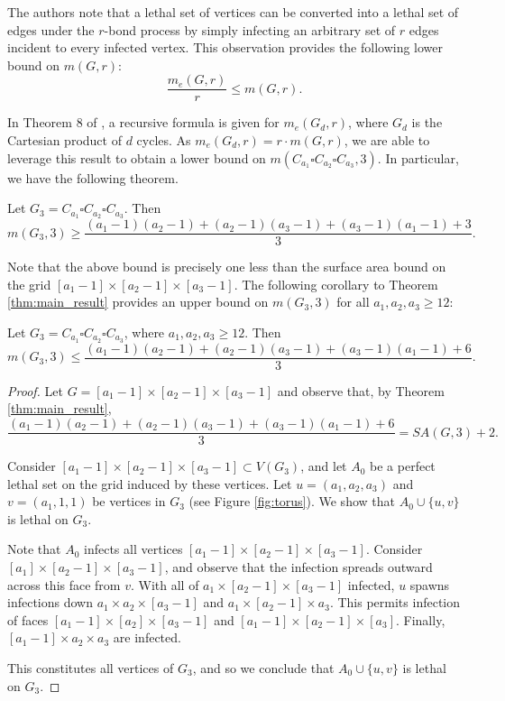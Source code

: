 The authors note that a lethal set of vertices can be converted into a lethal set of edges under the $r$-bond process by simply infecting an arbitrary set of $r$ edges incident to every infected vertex. This observation provides the following lower bound on $m(G,r)$:
$$\frac{m_e(G,r)}{r} \leq m(G,r).$$

In Theorem 8 of \cite{hambardzumyan:2020}, a recursive formula is given for $m_e(G_d,r)$, where $G_d$ is the Cartesian product of $d$ cycles. As $m_e(G_d,r) = r \cdot m(G,r)$, we are able to leverage this result to obtain a lower bound on $m(C_{a_1} \square C_{a_2} \square C_{a_3}, 3)$. In particular, we have the following theorem.

\begin{thm}
\label{thm:3d_torus_lb}
Let $G_3 = C_{a_1} \square C_{a_2} \square C_{a_3}$. Then
$$m(G_3,3) \geq \frac{(a_1-1)(a_2-1) + (a_2-1)(a_3-1) + (a_3-1)(a_1 -1) + 3}{3}.$$
\end{thm}

\noindent Note that the above bound is precisely one less than the surface area bound on the grid $[a_1-1] \times [a_2-1] \times [a_3-1]$. The following corollary to Theorem \ref{thm:main_result} provides an upper bound on $m(G_3,3)$ for all $a_1,a_2,a_3 \geq 12$:

\begin{cor}
Let $G_3 = C_{a_1} \square C_{a_2} \square C_{a_3}$, where $a_1,a_2,a_3 \geq 12$. Then
$$m(G_3,3) \leq \frac{(a_1-1)(a_2-1) + (a_2-1)(a_3-1) + (a_3-1)(a_1 -1) + 6}{3}.$$
\end{cor}

\begin{proof}
Let $G = [a_1-1] \times [a_2-1] \times [a_3-1]$ and observe that, by Theorem \ref{thm:main_result},
$$\frac{(a_1-1)(a_2-1) + (a_2-1)(a_3-1) + (a_3-1)(a_1 -1) + 6}{3} = SA(G,3) + 2.$$

Consider $[a_1-1] \times [a_2-1] \times [a_3-1] \subset V(G_3)$, and let $A_0$ be a perfect lethal set on the grid induced by these vertices. Let $u = (a_1,a_2,a_3)$ and $v = (a_1,1,1)$ be vertices in $G_3$ (see Figure \ref{fig:torus}). We show that $A_0 \cup \{u,v\}$ is lethal on $G_3$. 

Note that $A_0$ infects all vertices $[a_1-1] \times [a_2-1] \times [a_3-1]$. Consider $[a_1] \times [a_2-1] \times [a_3-1]$, and observe that the infection spreads outward across this face from $v$. With all of $a_1 \times [a_2-1] \times [a_3-1]$ infected, $u$ spawns infections down $a_1 \times a_2 \times [a_3-1]$ and $a_1 \times [a_2-1] \times a_3$. This permits infection of faces $[a_1-1] \times [a_2] \times [a_3-1]$ and $[a_1-1] \times [a_2-1] \times [a_3]$. Finally, $[a_1-1] \times a_2 \times a_3$ are infected.

This constitutes all vertices of $G_3$, and so we conclude that $A_0 \cup \{u,v\}$ is lethal on $G_3$. 
\end{proof}

